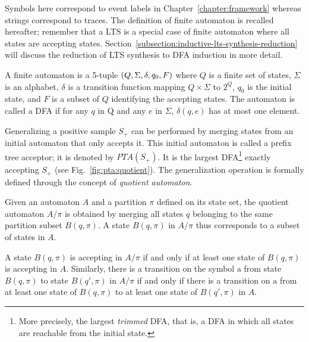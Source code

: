 Symbols here correspond to event labels in Chapter~\ref{chapter:framework} whereas strings correspond to traces. The definition of finite automaton is recalled hereafter; remember that a LTS is a special case of finite automaton where all states are accepting states. Section~\ref{subsection:inductive-lts-synthesis-reduction} will discuss the reduction of LTS synthesis to DFA induction in more detail. 

\begin{definition}
A finite automaton is a 5-tuple $(Q,\Sigma,\\\delta,q_0,F)$ where $Q$ is a finite set of states, $\Sigma$ is an alphabet, $\delta$ is a transition function mapping $Q\times\Sigma$ to $2^Q$, $q_0$ is the initial state, and $F$ is a subset of $Q$ identifying the accepting states. The automaton is called a DFA if for any $q$ in Q and any $e$ in $\Sigma$, $\delta(q,e)$ has at most one element. 
\end{definition}

Generalizing a positive sample $S_+$ can be performed by merging states from an initial automaton that only accepts it. This initial automaton is called a prefix tree acceptor; it is denoted by $PTA(S_+)$. It is the largest DFA\footnote{More precisely, the largest \emph{trimmed} DFA, that is, a DFA in which all states are reachable from the initial state.} exactly accepting $S_+$ (see Fig.~\ref{fig:pta:quotient}). The generalization operation is formally defined through the concept of \emph{quotient automaton}.

\begin{definition}
Given an automaton $A$ and a partition $\pi$ defined on its state set, the quotient automaton $A/\pi$ is obtained by merging all states $q$ belonging to the same partition subset $B(q,\pi)$. A state $B(q,\pi)$ in $A/\pi$ thus corresponds to a subset of states in $A$. 

A state $B(q,\pi)$ is accepting in $A/\pi$ if and only if at least one state of $B(q,\pi)$ is accepting in $A$. Similarly, there is a transition on the symbol $\mathrm{a}$ from state $B(q,\pi)$ to state $B(q',\pi)$ in $A/\pi$ if and only if there is a transition on $\mathrm{a}$ from at least one state of $B(q,\pi)$ to at least one state of $B(q',\pi)$ in $A$.
\label{definition:quotient-automaton}
\end{definition}

